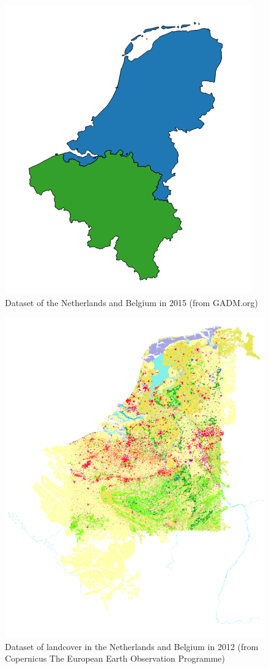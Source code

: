 \begin{figure}[!h]
	\centering
	\includegraphics[width=0.5\linewidth]{figs/Countries.png}
	\caption{Dataset of the Netherlands and Belgium in 2015 (from GADM.org)}
	\label{fig:countries}
\end{figure}

\begin{figure}[!h]
	\centering
	\includegraphics[width=1\linewidth]{figs/CORINE_NL_BE_color.PNG}
	\caption{Dataset of landcover in the Netherlands and Belgium in 2012 (from Copernicus  The European Earth Observation Programme)}
	\label{fig:CORINE}
\end{figure}

